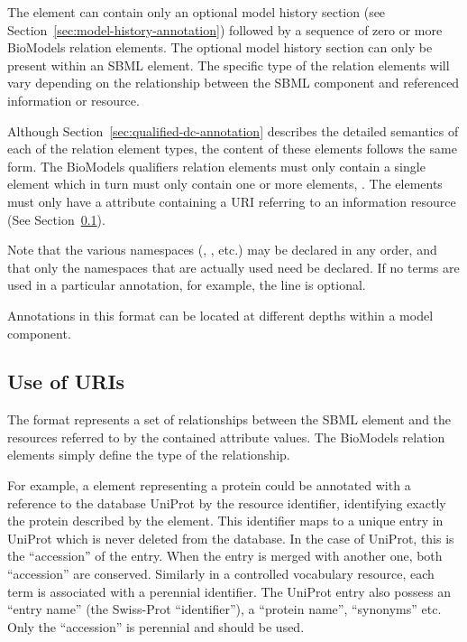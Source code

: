 The  element can contain only an optional
model history section (see
Section~\ref{sec:model-history-annotation}) followed by a sequence
of zero or more BioModels relation elements. The optional model
history section can only be present within an SBML \Model element.
The specific type of the relation elements will vary depending on
the relationship between the SBML component and referenced
information or resource.

Although Section~\ref{sec:qualified-dc-annotation} describes the
detailed semantics of each of the relation element types, the
content of these elements follows the same form.  The BioModels
qualifiers relation elements must only contain a single
 element which in turn must only contain one or
more  elements, .  The  elements must
only have a  attribute containing a URI
referring to an information resource (See
Section~\ref{sec:uri-in-annotation}).

\begin{blockChanged}
Note that the various namespaces (, , etc.) may be declared in any order, and that only the namespaces that are actually used need be declared.  If no  terms are used in a particular annotation, for example, the line  is optional. 
\end{blockChanged}

Annotations in this format can be located at different depths
within a model component.

\subsection{Use of URIs}
\label{sec:uri-in-annotation}

The format represents a set of relationships between the SBML
element and the resources referred to by the contained
 attribute values.  The BioModels relation
elements simply define the type of the relationship.

For example, a \Species element representing a protein could be
annotated with a reference to the database UniProt by the
 resource identifier,
identifying exactly the protein described by the \Species element.
This identifier maps to a unique entry in UniProt which is never
deleted from the database. In the case of UniProt, this is the
``accession'' of the entry. When the entry is merged with another
one, both ``accession'' are conserved. Similarly in a controlled
vocabulary resource, each term is associated with a perennial
identifier. The UniProt entry also possess an ``entry name'' (the
Swiss-Prot ``identifier''), a ``protein name'', ``synonyms'' etc.
Only the ``accession'' is perennial and should be used.

